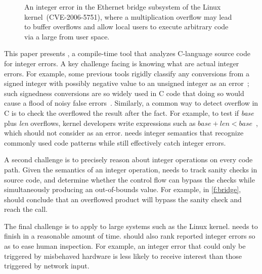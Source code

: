 \begin{figure}[t]
\centering

\vspace{-1em}
\caption{An integer error in the Ethernet bridge subsystem of the
Linux kernel~(CVE-2006-5751), where a multiplication overflow
may lead to buffer overflows and allow local users to execute
arbitrary code via a large  from user space.
}
\label{f:bridge}
\end{figure}

This paper presents \sys, a compile-time tool that analyzes C-language
source code for integer errors.
%
A key challenge facing \sys is knowing what are actual integer errors.  For
example, some previous tools rigidly classify any conversions from a
signed integer with possibly negative value to an unsigned integer
as an error~\cite{brumley:rich, moy:z3prefix, seacord:secure-c}; 
such signedness conversions are so widely used in C
code that doing so would cause a flood of noisy false
errors~\cite[\subsectionautorefname~6.2]{moy:z3prefix}.
Similarly, a common way to detect overflow in C is to 
check the overflowed the result after the fact. For example, to test
if \textit{base} plus \textit{len} overflows, kernel developers write
expressions such as $\mathit{base} + \mathit{len} < \mathit{base}$~\cite{ioc},
which \sys should not consider as an error.
\sys needs integer semantics that recognize commonly used code patterns
while still effectively catch integer errors.

A second challenge is to precisely reason about integer operations
on every code path.  Given the semantics of an integer operation,
\sys needs to track sanity checks in source code, and determine
whether the control flow can bypass the checks while simultaneously
producing an out-of-bounds value.  For example, in \autoref{f:bridge},
\sys should conclude that an overflowed product  will
bypass the sanity check and reach the  call.

The final challenge is to apply \sys to large systems such as the
Linux kernel.  \sys needs to finish in a
reasonable amount of time.  \sys should also rank reported integer
errors so as to ease human inspection.  For example, an integer error
that could only be triggered by misbehaved hardware is
less likely to receive interest than those triggered by network input.

